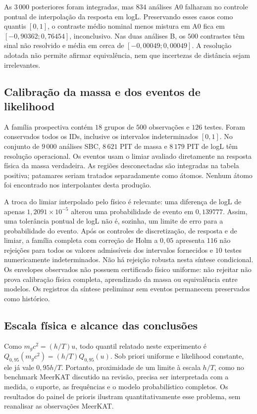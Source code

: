 As \(3\,000\) posteriores foram integradas, mas \(834\) análises A0
falharam no controle pontual de interpolação da resposta em logL.
Preservando esses casos como quantis \([0,1]\), o contraste médio
nominal menos mistura em A0 fica em \([-0,90362;0,76454]\), inconclusivo.
Nas duas análises B, os \(500\) contrastes têm sinal não resolvido e
média em cerca de \([-0,00049;0,00049]\). A resolução adotada não permite
afirmar equivalência, nem que incertezas de distância sejam irrelevantes.

\subsection{Calibração da massa e dos eventos de likelihood}

A família prospectiva contém \(18\) grupos de \(500\) observações e
\(126\) testes. Foram conservados todos os IDs, inclusive os intervalos
indeterminados \([0,1]\). No conjunto de \(9\,000\) análises SBC,
\(8\,621\) PIT de massa e \(8\,179\) PIT de logL têm resolução
operacional. Os eventos usam o limiar avaliado diretamente na resposta
física da massa verdadeira. As regiões desconectadas são integradas na
tabela positiva; patamares seriam tratados separadamente como átomos.
Nenhum átomo foi encontrado nos interpolantes desta produção.

A troca do limiar interpolado pelo físico é relevante: uma diferença de
logL de apenas \(1,2091\times10^{-5}\) alterou uma probabilidade de evento
em \(0,139777\). Assim, uma tolerância pontual de logL não é, sozinha,
um limite de erro para a probabilidade do evento. Após os controles de
discretização, de resposta e de limiar, a família completa com correção de
Holm a \(0,05\) apresenta \(116\) não rejeições para todos os valores
admissíveis dos intervalos fornecidos e \(10\) testes numericamente
indeterminados. Não há rejeição robusta nesta síntese condicional.
Os envelopes observados não possuem certificado físico uniforme:
não rejeitar não prova calibração física completa, aprendizado da massa
ou equivalência entre modelos. Os registros da síntese preliminar sem
eventos permanecem preservados como histórico.

\subsection{Escala física e alcance das conclusões}

Como \(m_gc^2=(h/T)u\), todo quantil relatado neste experimento é
\(Q_{0,95}(m_gc^2)=(h/T)Q_{0,95}(u)\). Sob priori uniforme e likelihood
constante, ele já vale \(0,95h/T\). Portanto, proximidade de um limite
à escala \(h/T\), como no benchmark MeerKAT discutido na revisão, precisa
ser interpretada com a medida, o suporte, as frequências e o modelo
probabilístico completos. Os resultados do painel de prioris ilustram
quantitativamente esse problema, sem reanalisar as observações MeerKAT.


